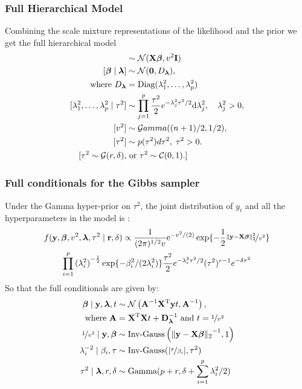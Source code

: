 \documentclass[10pt]{beamer}
\theoremstyle{plain}
\newcommand{\blankline}{\quad\pagebreak[3]}
\begin{document}
\begin{frame}
	\frametitle{Full Hierarchical Model }
Combining the scale mixture representations of the likelihood and the prior we get the full hierarchical model
\blankline
\begin{align*}%
[\y \mid \bbeta, v^2] & \sim \NormRV(\X \bbeta, v^2 \I) \\
[\bbeta \mid \blambda] & \sim \NormRV(\0, D_{\blambda}), \\ 
\text{where } D_{\blambda} &= \text{Diag}(\lambda_1^2, \ldots, \lambda_p^2) \\
[\lambda_1^2,\ldots , \lambda_p^2 \mid \tau^2] & \sim \prod_{j=1}^{p}\frac{\tau^2}{2} e^{-\lambda_j^2\tau^2/2} \d \lambda_j^2, \quad \lambda_j^2 > 0, \\
[v^2] & \sim \mathcal{G}amma((n+1)/2 , 1/2),  \\
[\tau^2] & \sim p(\tau^2) d\tau^2,  \; \tau^2 > 0. \\
[ \tau^2 \sim \GammaRV(r, \delta), & \text{ or } \tau^2 \sim \CauchyRV(0,1). ]
\end{align*}
	\end{frame}
	
	\begin{frame}
	\frametitle{Full conditionals for the Gibbs sampler}
	Under the Gamma hyper-prior on $\tau^2$, the joint distribution of $y_i$ and all the hyperparameters in the model is :
\begin{multline}
f({\bf y}, \boldsymbol{\beta}, v^2, \boldsymbol{\lambda}, \tau^2 \mid {\bf r}, \delta) \propto 
\frac{1}{(2 \pi)^{1/2} v} {\rm e}^{-{v^2}/({2})} \exp\{- \frac{1}{2} \nicefrac{\lVert{\bf y} - {\bf X} \boldsymbol{\beta}\rVert_2^2 }{v^2}\} \\
\prod_{i=1}^{p} {(\lambda_i^2)}^{-\frac{1}{2}} \exp\{-\beta_i^2/(2\lambda_i^2)\} \frac{\tau^2}{2} e^{-\lambda_i^2\tau^2/2} (\tau^2)^{r-1} e^{-\delta \tau^2} \label{eq:joint}
\end{multline}
So that the full conditionals are given by:
	\begin{align*}
\boldsymbol{\beta} \mid {\bf y}, \boldsymbol{\lambda}, t & \sim \mathcal{N} \left( {\bf A}^{-1}{\bf X}^{\rm T} {\bf y} t , {\bf A}^{-1} \right),\\
\text{ where } {\bf A} & = {\bf X}^{\rm T} {\bf X} t + {\bf D}_{\boldsymbol{\lambda}}^{-1} \ \text{and } t = \nicefrac{1}{v^2} \\
\nicefrac{1}{v^2} \mid {\bf y}, \boldsymbol{\beta} & \sim \text{Inv-Gauss} \left({\lVert{\bf y}-{\bf X}\boldsymbol{\beta}\rVert_2}^{-1}, 1 \right) \\
\lambda_i^{-2} \mid \beta_i, \tau & \sim \text{Inv-Gauss}(\lvert\nicefrac{\tau}{\beta_i}\rvert, \tau^2)\\
\tau^2 \mid \boldsymbol{\lambda}, r, \delta & \sim \text{Gamma}(p + r, \delta + \sum_{i=1}^{p} \lambda_i^2/2)
\end{align*}
	
\end{frame}
\end{document}
